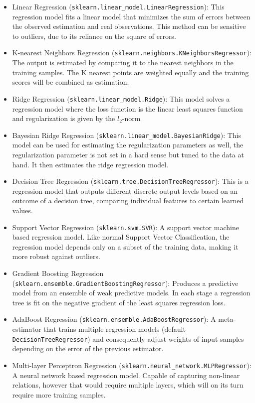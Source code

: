 \begin{itemize}
	\item Linear Regression (\verb|sklearn.linear_model.LinearRegression|): This regression model fits a linear model that minimizes the sum of errors between the observed estimation and real observations. This method can be sensitive to outliers, due to its reliance on the square of errors.
	\item K-nearest Neighbors Regression (\verb|sklearn.neighbors.KNeighborsRegressor|): The output is estimated by comparing it to the nearest neighbors in the training samples. The K nearest points are weighted equally and the training scores will be combined as estimation.
	\item Ridge Regression (\verb|sklearn.linear_model.Ridge|): This model solves a regression model where the loss function is the linear least squares function and regularization is given by the $l_2$-norm
	\item Bayesian Ridge Regression (\verb|sklearn.linear_model.BayesianRidge|): This model can be used for estimating the regularization parameters as well, the regularization parameter is not set in a hard sense but tuned to the data at hand. It then estimates the ridge regression model.
	\item Decision Tree Regression (\verb|sklearn.tree.DecisionTreeRegressor|): This is a regression model that outputs different discrete output levels based on an outcome of a decision tree, comparing individual features to certain learned values.
	\item Support Vector Regression (\verb|sklearn.svm.SVR|): A support vector machine based regression model. Like normal Support Vector Classification, the regression model depends only on a subset of the training data, making it more robust against outliers.
	\item Gradient Boosting Regression (\verb|sklearn.ensemble.GradientBoostingRegressor|): Produces a predictive model from an ensemble of weak predictive models. In each stage a regression tree is fit on the negative gradient of the least squares regression loss.
	\item AdaBoost Regression (\verb|sklearn.ensemble.AdaBoostRegressor|): A meta-estimator that trains multiple regression models (default \verb|DecisionTreeRegressor|) and consequently adjust weights of input samples depending on the error of the previous estimator.
	\item Multi-layer Perceptron Regression (\verb|sklearn.neural_network.MLPRegressor|): A neural network based regression model. Capable of capturing non-linear relations, however that would require multiple layers, which will on its turn require more training samples. 
\end{itemize}


